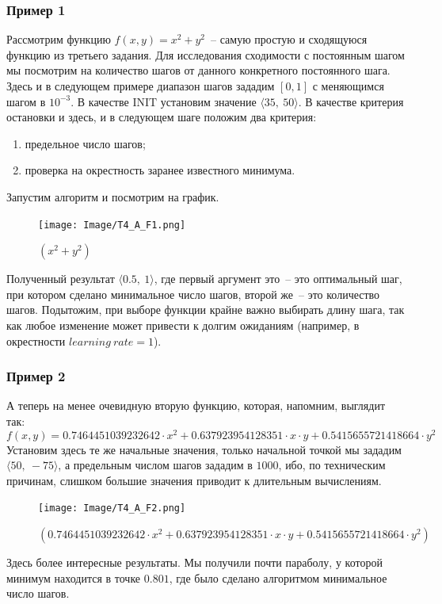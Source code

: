 \documentclass[12pt, a4paper, oneside, final]{article}
\begin{document}
	\subsubsection*{Пример 1}
	Рассмотрим функцию $f(x, y) = x^{2} + y^{2}$~-- самую простую и сходящуюся функцию из третьего задания. Для исследования сходимости с постоянным шагом мы посмотрим на количество шагов от данного конкретного постоянного шага. Здесь и в следующем примере диапазон шагов зададим $[0, 1]$ с меняющимся шагом в $10^{-3}$. В качестве $\text{INIT}$ установим значение $\langle 35, ~ 50 \rangle$. В качестве критерия остановки и здесь, и в следующем шаге положим два критерия:
	\begin{enumerate}[(1)]
		\item предельное число шагов;
		\item проверка на окрестность заранее известного минимума.
	\end{enumerate}
	Запустим алгоритм и посмотрим на график.
	\begin{figure}[H]
		\centering
		\texttt{[image: Image/T4\_A\_F1.png]}
		\caption{$(x^{2} + y^{2})$}
	\end{figure}
	Полученный результат $\langle 0.5, ~ 1 \rangle$, где первый аргумент это~-- это оптимальный шаг, при котором сделано минимальное число шагов, второй же~-- это количество шагов. Подытожим, при выборе функции крайне важно выбирать длину шага, так как любое изменение может привести к долгим ожиданиям (например, в окрестности $learning~rate = 1$).
	\subsubsection*{Пример 2}
	А теперь на менее очевидную вторую функцию, которая, напомним, выглядит так:
	\[
		f(x, y) = 0.7464451039232642 \cdot x^{2} + 0.637923954128351 \cdot x \cdot y + 0.5415655721418664 \cdot y^{2}
	\]
	Установим здесь те же начальные значения, только начальной точкой мы зададим $\langle 50, ~ -75 \rangle$, а предельным числом шагов зададим в $1000$, ибо, по техническим причинам, слишком большие значения приводит к длительным вычислениям.
	\begin{figure}[H]
		\centering
		\texttt{[image: Image/T4\_A\_F2.png]}
		\caption{$( 0.7464451039232642 \cdot x^{2} + 0.637923954128351 \cdot x \cdot y + 0.5415655721418664 \cdot y^{2})$}
	\end{figure}
	Здесь более интересные результаты. Мы получили почти параболу, у которой минимум находится в точке $0.801$, где было сделано алгоритмом минимальное число шагов.
\end{document}
